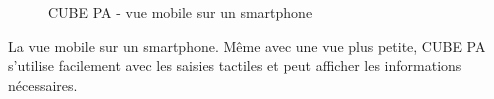 \vspace{\baselineskip}

\begin{figure}[H]
\caption{CUBE PA - vue mobile sur un smartphone}
\end{figure}

La vue mobile sur un smartphone. Même avec une vue plus petite, CUBE PA s'utilise facilement avec les saisies tactiles et peut afficher les informations nécessaires.

